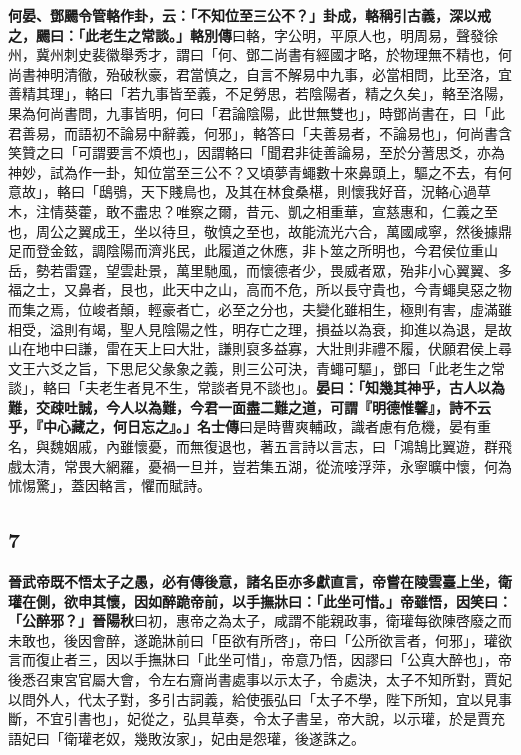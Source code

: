 \textbf{何晏、鄧颺令管輅作卦，云：「不知位至三公不？」卦成，輅稱引古義，深以戒之，颺曰：「此老生之常談。」}{\footnotesize \textbf{輅別傳}曰輅，字公明，平原人也，明周易，聲發徐州，冀州刺史裴徽舉秀才，謂曰「何、鄧二尚書有經國才略，於物理無不精也，何尚書神明清徹，殆破秋豪，君當慎之，自言不解易中九事，必當相問，比至洛，宜善精其理」，輅曰「若九事皆至義，不足勞思，若陰陽者，精之久矣」，輅至洛陽，果為何尚書問，九事皆明，何曰「君論陰陽，此世無雙也」，時鄧尚書在，曰「此君善易，而語初不論易中辭義，何邪」，輅答曰「夫善易者，不論易也」，何尚書含笑贊之曰「可謂要言不煩也」，因謂輅曰「聞君非徒善論易，至於分蓍思爻，亦為神妙，試為作一卦，知位當至三公不？又頃夢青蠅數十來鼻頭上，驅之不去，有何意故」，輅曰「鴟鴞，天下賤鳥也，及其在林食桑椹，則懷我好音，況輅心過草木，注情葵藿，敢不盡忠？唯察之爾，昔元、凱之相重華，宣慈惠和，仁義之至也，周公之翼成王，坐以待旦，敬慎之至也，故能流光六合，萬國咸寧，然後據鼎足而登金鉉，調陰陽而濟兆民，此履道之休應，非卜筮之所明也，今君侯位重山岳，勢若雷霆，望雲赴景，萬里馳風，而懷德者少，畏威者眾，殆非小心翼翼、多福之士，又鼻者，艮也，此天中之山，高而不危，所以長守貴也，今青蠅臭惡之物而集之焉，位峻者顛，輕豪者亡，必至之分也，夫變化雖相生，極則有害，虛滿雖相受，溢則有竭，聖人見陰陽之性，明存亡之理，損益以為衰，抑進以為退，是故山在地中曰謙，雷在天上曰大壯，謙則裒多益寡，大壯則非禮不履，伏願君侯上尋文王六爻之旨，下思尼父彖象之義，則三公可決，青蠅可驅」，鄧曰「此老生之常談」，輅曰「夫老生者見不生，常談者見不談也」。}\textbf{晏曰：「知幾其神乎，古人以為難，交疎吐誠，今人以為難，今君一面盡二難之道，可謂『明德惟馨』，詩不云乎，『中心藏之，何日忘之』。」}{\footnotesize \textbf{名士傳}曰是時曹爽輔政，識者慮有危機，晏有重名，與魏姻戚，內雖懷憂，而無復退也，著五言詩以言志，曰「鴻鵠比翼遊，群飛戲太清，常畏大網羅，憂禍一旦并，豈若集五湖，從流唼浮萍，永寧曠中懷，何為怵惕驚」，蓋因輅言，懼而賦詩。}

\subsection*{7}

\textbf{晉武帝既不悟太子之愚，必有傳後意，諸名臣亦多獻直言，帝嘗在陵雲臺上坐，衛瓘在側，欲申其懷，因如醉跪帝前，以手撫牀曰：「此坐可惜。」帝雖悟，因笑曰：「公醉邪？」}{\footnotesize \textbf{晉陽秋}曰初，惠帝之為太子，咸謂不能親政事，衛瓘每欲陳啓廢之而未敢也，後因會醉，遂跪牀前曰「臣欲有所啓」，帝曰「公所欲言者，何邪」，瓘欲言而復止者三，因以手撫牀曰「此坐可惜」，帝意乃悟，因謬曰「公真大醉也」，帝後悉召東宮官屬大會，令左右齎尚書處事以示太子，令處決，太子不知所對，賈妃以問外人，代太子對，多引古詞義，給使張弘曰「太子不學，陛下所知，宜以見事斷，不宜引書也」，妃從之，弘具草奏，令太子書呈，帝大說，以示瓘，於是賈充語妃曰「衛瓘老奴，幾敗汝家」，妃由是怨瓘，後遂誅之。}

